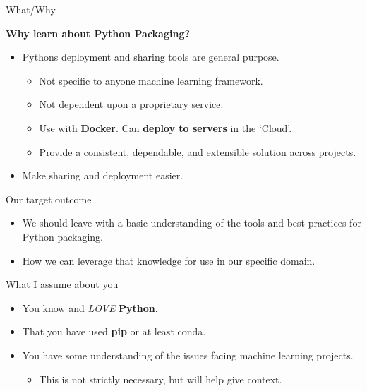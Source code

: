 \documentclass[10pt]{beamer}
\begin{document}
\begin{frame}[fragile]{What/Why}

  \textbf{Why learn about Python Packaging?}
  \begin{itemize}
    \item Pythons deployment and sharing tools are general purpose.
      \begin{itemize}
        \item Not specific to anyone machine learning framework.
        \item Not dependent upon a proprietary service.
        \item Use with \textbf{Docker}. Can \textbf{deploy to servers} in the `Cloud'.
        \item Provide a consistent, dependable, and extensible solution across projects.
      \end{itemize}
    \item Make sharing and deployment easier.
  \end{itemize}
  
\end{frame}

\begin{frame}[fragile]{Our target outcome}


  \begin{itemize}
    \item We should leave with a basic understanding of the tools and best practices for Python packaging.

    \item How we can leverage that knowledge for use in our specific domain.
  \end{itemize}

\end{frame}

\begin{frame}[fragile]{What I assume about you}

  \begin{itemize}
    \item You know and \textit{LOVE} \textbf{Python}.
    \item That you have used \textbf{pip} or at least conda.
    \item You have some understanding of the issues facing machine learning projects.
      \begin{itemize}
        \item This is not strictly necessary, but will help give context.
      \end{itemize}
  \end{itemize}

\end{frame}
\end{document}
